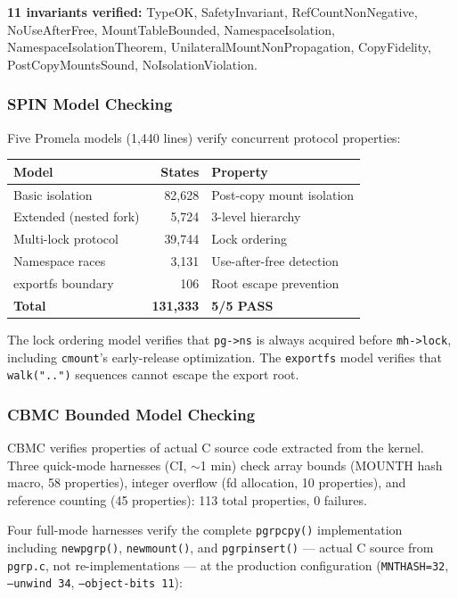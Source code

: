 \documentclass{article}
\begin{document}
\textbf{11 invariants verified:} TypeOK, SafetyInvariant, RefCountNonNegative,
NoUseAfterFree, MountTableBounded, NamespaceIsolation, NamespaceIsolationTheorem,
UnilateralMountNonPropagation, CopyFidelity, PostCopyMountsSound, NoIsolationViolation.

\subsubsection{SPIN Model Checking}

Five Promela models (1,440 lines) verify concurrent protocol properties:

\begin{center}
\small
\begin{tabular}{p{3.2cm}rl}
\textbf{Model} & \textbf{States} & \textbf{Property} \\
\hline
Basic isolation & 82,628 & Post-copy mount isolation \\
Extended (nested fork) & 5,724 & 3-level hierarchy \\
Multi-lock protocol & 39,744 & Lock ordering \\
Namespace races & 3,131 & Use-after-free detection \\
exportfs boundary & 106 & Root escape prevention \\
\hline
\textbf{Total} & \textbf{131,333} & \textbf{5/5 PASS} \\
\end{tabular}
\end{center}

The lock ordering model verifies that \texttt{pg->ns} is always acquired before
\texttt{mh->lock}, including \texttt{cmount}'s early-release optimization. The
\texttt{exportfs} model verifies that \texttt{walk("..")} sequences cannot escape the
export root.


\subsubsection{CBMC Bounded Model Checking}

CBMC verifies properties of actual C source code extracted from the kernel.
Three quick-mode harnesses (CI, $\sim$1 min) check array bounds (MOUNTH hash macro,
58 properties), integer overflow (fd allocation, 10 properties), and reference
counting (45 properties): 113 total properties, 0 failures.

Four full-mode harnesses verify the complete \texttt{pgrpcpy()} implementation
including \texttt{newpgrp()}, \texttt{newmount()}, and \texttt{pgrpinsert()} ---
actual C source from \texttt{pgrp.c}, not re-implementations --- at the production
configuration (\texttt{MNTHASH=32}, \texttt{--unwind 34}, \texttt{--object-bits 11}):
\end{document}
